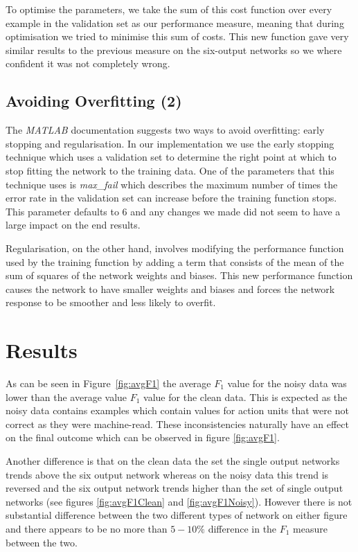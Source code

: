 \documentclass[10pt,a4paper]{article}
\begin{document}
To optimise the parameters, we take the sum of this cost function over every example in the validation set as our performance measure, meaning that during optimisation we tried to minimise this sum of costs. This new function gave very similar results to the previous measure on the six-output networks so we where confident it was not completely wrong.

\subsection{Avoiding Overfitting (2)}
The \emph{MATLAB} documentation suggests two ways to avoid overfitting: early stopping and regularisation. In our implementation we use the early stopping technique which uses a validation set to determine the right point at which to stop fitting the network to the training data. One of the parameters that this technique uses is \emph{max\_fail} which describes the maximum number of times the error rate in the validation set can increase before the training function stops. This parameter defaults to 6 and any changes we made did not seem to have a large impact on the end results.

Regularisation, on the other hand, involves modifying the performance function used by the training function by adding a term that consists of the mean of the sum of squares of the network weights and biases. This new performance function causes the network to have smaller weights and biases and forces the network response to be smoother and less likely to overfit.

\section{Results}

As can be seen in Figure~\ref{fig:avgF1} the average $F_1$ value for the noisy data was lower than the average value $F_1$ value for the clean data. This is expected as the noisy data contains examples which contain values for action units that were not correct as they were machine-read. These inconsistencies naturally have an effect on the final outcome which can be observed in figure \ref{fig:avgF1}.

Another difference is that on the clean data the set the single output networks trends above the six output network whereas on the noisy data this trend is reversed and the six output network trends higher than the set of single output networks (see figures \ref{fig:avgF1Clean} and \ref{fig:avgF1Noisy}). However there is not substantial difference between the two different types of network on either figure and there appears to be no more than $5-10\%$ difference in the $F_1$ measure between the two.
\end{document}
